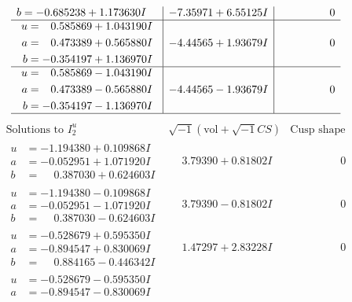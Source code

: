 \documentclass[1p]{elsarticle_modified}
\theoremstyle{definition}
\newcommand{\I}{\sqrt{-1}}
\begin{document}
$$\begin{array}{c|c|c}
\begin{aligned}
b &= -0.685238 + 1.173630 I\end{aligned}
 & -7.35971 + 6.55125 I & \phantom{-0.000000 } 0 \\ \hline\begin{aligned}
u &= \phantom{-}0.585869 + 1.043190 I \\
a &= \phantom{-}0.473389 + 0.565880 I \\
b &= -0.354197 + 1.136970 I\end{aligned}
 & -4.44565 + 1.93679 I & \phantom{-0.000000 } 0 \\ \hline\begin{aligned}
u &= \phantom{-}0.585869 - 1.043190 I \\
a &= \phantom{-}0.473389 - 0.565880 I \\
b &= -0.354197 - 1.136970 I\end{aligned}
 & -4.44565 - 1.93679 I & \phantom{-0.000000 } 0\\
 \hline 
 \end{array}$$\newpage$$\begin{array}{c|c|c}  
\text{Solutions to }I^u_{2}& \I (\text{vol} + \sqrt{-1}CS) & \text{Cusp shape}\\
 \hline 
\begin{aligned}
u &= -1.194380 + 0.109868 I \\
a &= -0.052951 + 1.071920 I \\
b &= \phantom{-}0.387030 + 0.624603 I\end{aligned}
 & \phantom{-}3.79390 + 0.81802 I & \phantom{-0.000000 } 0 \\ \hline\begin{aligned}
u &= -1.194380 - 0.109868 I \\
a &= -0.052951 - 1.071920 I \\
b &= \phantom{-}0.387030 - 0.624603 I\end{aligned}
 & \phantom{-}3.79390 - 0.81802 I & \phantom{-0.000000 } 0 \\ \hline\begin{aligned}
u &= -0.528679 + 0.595350 I \\
a &= -0.894547 + 0.830069 I \\
b &= \phantom{-}0.884165 - 0.446342 I\end{aligned}
 & \phantom{-}1.47297 + 2.83228 I & \phantom{-0.000000 } 0 \\ \hline\begin{aligned}
u &= -0.528679 - 0.595350 I \\
a &= -0.894547 - 0.830069 I \\

\end{aligned}
\end{array}$$
\end{document}
